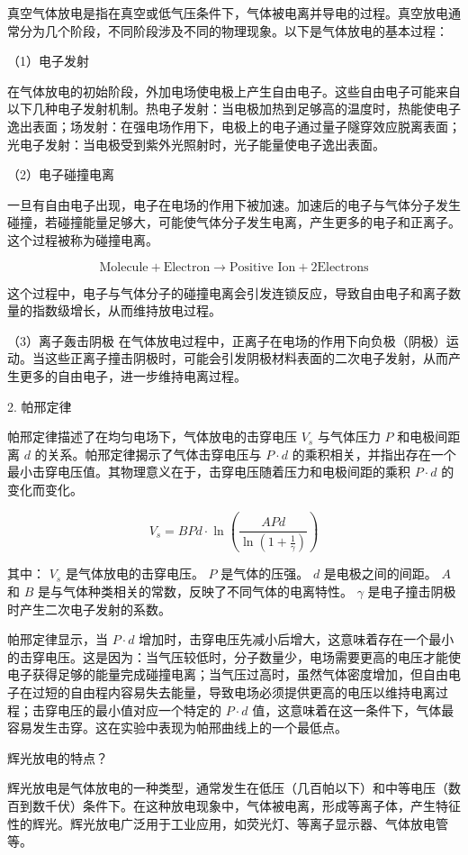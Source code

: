 \documentclass[dvipsnames, svgnames,a4paper,11pt]{article}
\begin{document}
真空气体放电是指在真空或低气压条件下，气体被电离并导电的过程。真空放电通常分为几个阶段，不同阶段涉及不同的物理现象。以下是气体放电的基本过程：

（1）电子发射

在气体放电的初始阶段，外加电场使电极上产生自由电子。这些自由电子可能来自以下几种电子发射机制。热电子发射：当电极加热到足够高的温度时，热能使电子逸出表面；场发射：在强电场作用下，电极上的电子通过量子隧穿效应脱离表面；光电子发射：当电极受到紫外光照射时，光子能量使电子逸出表面。

（2）电子碰撞电离

一旦有自由电子出现，电子在电场的作用下被加速。加速后的电子与气体分子发生碰撞，若碰撞能量足够大，可能使气体分子发生电离，产生更多的电子和正离子。这个过程被称为碰撞电离。

\[
\text{Molecule} + \text{Electron} \rightarrow \text{Positive Ion} + 2\text{Electrons}
\]

这个过程中，电子与气体分子的碰撞电离会引发连锁反应，导致自由电子和离子数量的指数级增长，从而维持放电过程。

（3）离子轰击阴极
在气体放电过程中，正离子在电场的作用下向负极（阴极）运动。当这些正离子撞击阴极时，可能会引发阴极材料表面的二次电子发射，从而产生更多的自由电子，进一步维持电离过程。


2. 帕邢定律

帕邢定律描述了在均匀电场下，气体放电的击穿电压 \(V_s\) 与气体压力 \(P\) 和电极间距离 \(d\) 的关系。帕邢定律揭示了气体击穿电压与 \(P \cdot d\) 的乘积相关，并指出存在一个最小击穿电压值。其物理意义在于，击穿电压随着压力和电极间距的乘积 \(P \cdot d\) 的变化而变化。

\[
V_s = B P d \cdot \ln \left( \frac{A P d}{\ln\left(1 + \frac{1}{\gamma}\right)} \right)
\]

其中：
 \( V_s \) 是气体放电的击穿电压。
\( P \) 是气体的压强。
 \( d \) 是电极之间的间距。
 \( A \) 和 \( B \) 是与气体种类相关的常数，反映了不同气体的电离特性。
 \( \gamma \) 是电子撞击阴极时产生二次电子发射的系数。

帕邢定律显示，当 \( P \cdot d \) 增加时，击穿电压先减小后增大，这意味着存在一个最小的击穿电压。这是因为：当气压较低时，分子数量少，电场需要更高的电压才能使电子获得足够的能量完成碰撞电离；当气压过高时，虽然气体密度增加，但自由电子在过短的自由程内容易失去能量，导致电场必须提供更高的电压以维持电离过程；击穿电压的最小值对应一个特定的 \(P \cdot d\) 值，这意味着在这一条件下，气体最容易发生击穿。这在实验中表现为帕邢曲线上的一个最低点。


\begin{question}
	辉光放电的特点？
\end{question}
辉光放电是气体放电的一种类型，通常发生在低压（几百帕以下）和中等电压（数百到数千伏）条件下。在这种放电现象中，气体被电离，形成等离子体，产生特征性的辉光。辉光放电广泛用于工业应用，如荧光灯、等离子显示器、气体放电管等。
\end{document}
